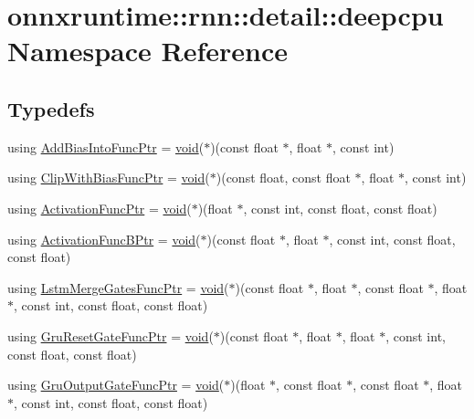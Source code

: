 \hypertarget{namespaceonnxruntime_1_1rnn_1_1detail_1_1deepcpu}{}\section{onnxruntime\+:\+:rnn\+:\+:detail\+:\+:deepcpu Namespace Reference}
\label{namespaceonnxruntime_1_1rnn_1_1detail_1_1deepcpu}
\subsection*{Typedefs}
\begin{DoxyCompactItemize}
\item 
using \mbox{\hyperlink{namespaceonnxruntime_1_1rnn_1_1detail_1_1deepcpu_a8b1f80ae5020b2ff8e057c5aa8180c28}{Add\+Bias\+Into\+Func\+Ptr}} = \mbox{\hyperlink{mlasi_8h_a88f941d423cb2a819b70a1358982b1a6}{void}}($\ast$)(const float $\ast$, float $\ast$, const int)
\item 
using \mbox{\hyperlink{namespaceonnxruntime_1_1rnn_1_1detail_1_1deepcpu_ae72a03e6191d492760e3d7b02f470564}{Clip\+With\+Bias\+Func\+Ptr}} = \mbox{\hyperlink{mlasi_8h_a88f941d423cb2a819b70a1358982b1a6}{void}}($\ast$)(const float, const float $\ast$, float $\ast$, const int)
\item 
using \mbox{\hyperlink{namespaceonnxruntime_1_1rnn_1_1detail_1_1deepcpu_a84524fa5e01a6b98b4bb83052910a9a6}{Activation\+Func\+Ptr}} = \mbox{\hyperlink{mlasi_8h_a88f941d423cb2a819b70a1358982b1a6}{void}}($\ast$)(float $\ast$, const int, const float, const float)
\item 
using \mbox{\hyperlink{namespaceonnxruntime_1_1rnn_1_1detail_1_1deepcpu_a51c9012fb1a1a79abced776e7be2ca47}{Activation\+Func\+B\+Ptr}} = \mbox{\hyperlink{mlasi_8h_a88f941d423cb2a819b70a1358982b1a6}{void}}($\ast$)(const float $\ast$, float $\ast$, const int, const float, const float)
\item 
using \mbox{\hyperlink{namespaceonnxruntime_1_1rnn_1_1detail_1_1deepcpu_a4a3c3b91f46237728f04b977a7c3e5f5}{Lstm\+Merge\+Gates\+Func\+Ptr}} = \mbox{\hyperlink{mlasi_8h_a88f941d423cb2a819b70a1358982b1a6}{void}}($\ast$)(const float $\ast$, float $\ast$, const float $\ast$, float $\ast$, const int, const float, const float)
\item 
using \mbox{\hyperlink{namespaceonnxruntime_1_1rnn_1_1detail_1_1deepcpu_ac5be6e1baa411048d5f8baf3d4551e3c}{Gru\+Reset\+Gate\+Func\+Ptr}} = \mbox{\hyperlink{mlasi_8h_a88f941d423cb2a819b70a1358982b1a6}{void}}($\ast$)(const float $\ast$, float $\ast$, float $\ast$, const int, const float, const float)
\item 
using \mbox{\hyperlink{namespaceonnxruntime_1_1rnn_1_1detail_1_1deepcpu_a36e4209baa17c6f915ca2c8ea476decc}{Gru\+Output\+Gate\+Func\+Ptr}} = \mbox{\hyperlink{mlasi_8h_a88f941d423cb2a819b70a1358982b1a6}{void}}($\ast$)(float $\ast$, const float $\ast$, const float $\ast$, float $\ast$, const int, const float, const float)
\end{DoxyCompactItemize}
